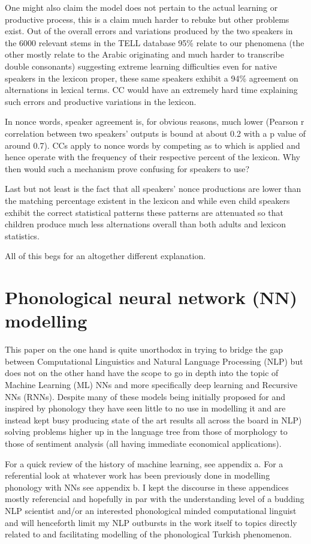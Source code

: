 \documentclass[a4paper,12pt]{article}
\begin{document}
One might also claim the model does not pertain to the actual learning or productive process, this
is a claim much harder to rebuke but other problems exist. Out of the overall errors and variations
produced by the two speakers in the 6000 relevant stems in the TELL database 95\% relate to our
phenomena (the other mostly relate to the Arabic originating and much harder to transcribe double
consonants) suggesting extreme learning difficulties even for native speakers in the lexicon
proper, these same speakers exhibit a 94\% agreement on alternations in lexical terms. CC would have
an extremely hard time explaining such errors and productive variations in the lexicon.

In nonce words, speaker agreement is, for obvious reasons, much lower (Pearson r correlation between
two speakers' outputs is bound at about 0.2 with a p value of around 0.7). CCs apply to nonce words
by competing as to which is applied and hence operate with the frequency of their respective
percent of the lexicon. Why then would such a mechanism prove confusing for speakers to use?

Last but not least is the fact that all speakers' nonce productions are lower than the matching
percentage existent in the lexicon and while even child speakers exhibit the correct statistical
patterns these patterns are attenuated so that children produce much less alternations overall than
both adults and lexicon statistics.

All of this begs for an altogether different explanation.

\section{Phonological neural network (NN) modelling}

This paper on the one hand is quite unorthodox in trying to bridge the gap between Computational
Linguistics and Natural Language Processing (NLP) but does not on the other hand have the scope to
go in depth into the topic of Machine Learning (ML) NNs and more specifically deep learning and
Recursive NNs (RNNs). Despite many of these models being initially proposed for and inspired by
phonology they have seen little to no use in modelling it and are instead kept busy producing state
of the art results all across the board in NLP) solving problems higher up in the language tree
from those of morphology to those of sentiment analysis (all having immediate economical applications).

For a quick review of the history of machine learning, see appendix a. For a referential look at
whatever work has been previously done in modelling phonology with NNs see appendix b. I kept the
discourse in these appendices mostly referencial and hopefully in par with the understanding level
of a budding NLP scientist and/or an interested phonological minded computational linguist and will
henceforth limit my NLP outbursts in the work itself to topics directly related to and facilitating
modelling of the phonological Turkish phenomenon.
\end{document}
